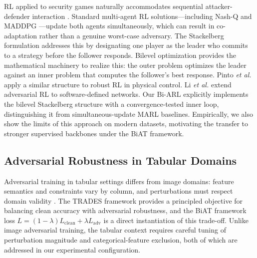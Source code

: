 RL applied to security games naturally accommodates sequential attacker-defender interaction \cite{malialis2015multiagent, anderson2016rl_security}. Standard multi-agent RL solutions---including Nash-Q \cite{hu2003nashq} and MADDPG \cite{lowe2017maddpg}---update both agents simultaneously, which can result in co-adaptation rather than a genuine worst-case adversary. The Stackelberg formulation \cite{vonStackelberg1952, colson2007bilevel} addresses this by designating one player as the leader who commits to a strategy before the follower responds. Bilevel optimization \cite{sinha2018bilevel, bard1998bilevel} provides the mathematical machinery to realize this: the outer problem optimizes the leader against an inner problem that computes the follower's best response. Pinto \emph{et al.} \cite{pinto2017robust_rl} apply a similar structure to robust RL in physical control. Li \emph{et al.} \cite{li2022advrl_security} extend adversarial RL to software-defined networks. Our Bi-ARL explicitly implements the bilevel Stackelberg structure with a convergence-tested inner loop, distinguishing it from simultaneous-update MARL baselines. Empirically, we also show the limits of this approach on modern datasets, motivating the transfer to stronger supervised backbones under the BiAT framework.

\subsection{Adversarial Robustness in Tabular Domains}

Adversarial training in tabular settings differs from image domains: feature semantics and constraints vary by column, and perturbations must respect domain validity \cite{apruzzese2022adversarial_nids, biggio2013evasion}. The TRADES framework \cite{zhang2019trades} provides a principled objective for balancing clean accuracy with adversarial robustness, and the BiAT framework loss $L = (1-\lambda)L_{\text{clean}} + \lambda L_{\text{adv}}$ is a direct instantiation of this trade-off. Unlike image adversarial training, the tabular context requires careful tuning of perturbation magnitude and categorical-feature exclusion, both of which are addressed in our experimental configuration.
